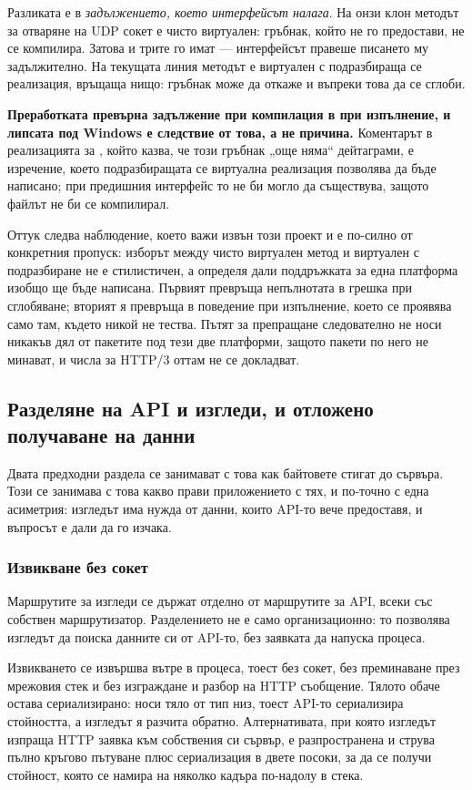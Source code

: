 Разликата е в \emph{задължението, което интерфейсът налага}. На онзи клон методът за отваряне на UDP
сокет е чисто виртуален: гръбнак, който не го предостави, не се компилира. Затова и трите го имат —
интерфейсът правеше писането му задължително. На текущата линия методът е виртуален с подразбираща се
реализация, връщаща нищо: гръбнак може да откаже и въпреки това да се сглоби.

\textbf{Преработката превърна задължение при компилация в  при изпълнение, и липсата
под Windows е следствие от това, а не причина.} Коментарът в реализацията за , който казва,
че този гръбнак „още няма“ дейтаграми, е изречение, което подразбиращата се виртуална реализация
позволява да бъде написано; при предишния интерфейс то не би могло да съществува, защото файлът не би
се компилирал.

Оттук следва наблюдение, което важи извън този проект и е по-силно от конкретния пропуск: изборът
между чисто виртуален метод и виртуален с подразбиране не е стилистичен, а определя дали поддръжката
за една платформа изобщо ще бъде написана. Първият превръща непълнотата в грешка при сглобяване;
вторият я превръща в поведение при изпълнение, което се проявява само там, където никой не тества. Пътят за препращане следователно не носи
никакъв дял от пакетите под тези две платформи, защото пакети по него не минават, и числа за
HTTP/3 оттам не се докладват.

\subsection{Разделяне на API и изгледи, и отложено получаване на данни}
\label{sec:deferred}

Двата предходни раздела се занимават с това как байтовете стигат до сървъра. Този се
занимава с това какво прави приложението с тях, и по-точно с една асиметрия: изгледът има
нужда от данни, които API-то вече предоставя, и въпросът е дали да го изчака.

\subsubsection{Извикване без сокет}

Маршрутите за изгледи се държат отделно от маршрутите за API, всеки със собствен
маршрутизатор. Разделението не е само организационно: то позволява изгледът да поиска
данните си от API-то, без заявката да напуска процеса.

Извикването се извършва вътре в процеса, тоест без сокет, без преминаване през мрежовия
стек и без изграждане и разбор на HTTP съобщение. Тялото обаче остава сериализирано:
 носи тяло от тип низ, тоест API-то сериализира стойността, а изгледът я
разчита обратно. Алтернативата, при която изгледът изпраща HTTP заявка към
собствения си сървър, е разпространена и струва пълно кръгово пътуване плюс сериализация в
двете посоки, за да се получи стойност, която се намира на няколко кадъра по-надолу в
стека.

